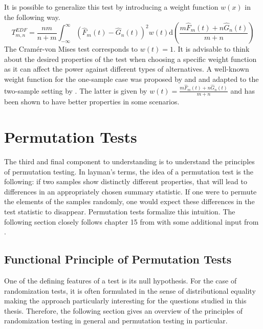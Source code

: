 \documentclass[12pt, a4paper]{article}
\theoremstyle{MAstyle} \newtheorem{assumption}{Assumption}[section]
\theoremstyle{MAstyle} \newtheorem{definition}{Definition}[section]
\theoremstyle{MAstyle} \newtheorem{theorem}{Theorem}[section]
\begin{document}
			It is possible to generalize this test by introducing a weight function $w(x)$ in the following way. 
			\begin{equation}
				T^{\textit{EDF}}_{m,n} = \frac{nm}{n+m} \int_{-\infty}^{\infty}\left(\hat{F}_{m}(t) - \hat{G}_{n}(t)\right)^{2} w(t) \mathrm{d} \left(\frac{m \hat{F}_{m}(t) + n \hat{G}_{n}(t)}{m+n}\right)
			\end{equation}
			The Cram\'{e}r-von Mises test corresponds to $w(t) = 1$. It is advisable to think about the desired properties of the test when choosing a specific weight function as it can affect the power against different types of alternatives. A well-known weight function for the one-sample case was proposed by \cite{anderson_asymptotic_1952} and \cite{anderson_test_1954} and adapted to the two-sample setting by \cite{pettitt_two-sample_1976}. The latter is given by $w(t) = \frac{m \hat{F}_m(t) + n \hat{G}_n(t)}{m+n}$ and has been shown to have better properties in some scenarios.					
			
	\section{Permutation Tests}\label{Permutation_Tests}
		The third and final component to understanding \cite{bugni_permutation_2021} is to understand the principles of permutation testing.
		In layman's terms, the idea of a permutation test is the following: if two samples show distinctly different properties, that will lead to differences in an appropriately chosen summary statistic. If one were to permute the elements of the samples randomly, one would expect these differences in the test statistic to disappear.
		Permutation tests formalize this intuition. The following section closely follows chapter 15 from \cite{lehmann_testing_2005} with some additional input from \cite{van_der_vaart_weak_1996}.
	
		\subsection{Functional Principle of Permutation Tests}
			One of the defining features of a test is its null hypothesis. For the case of randomization tests, it is often formulated in the sense of distributional equality making the approach particularly interesting for the questions studied in this thesis. Therefore, the following section gives an overview of the principles of randomization testing in general and permutation testing in particular.
			
\end{document}
